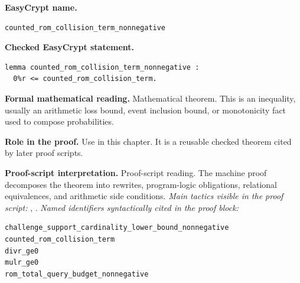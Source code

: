 \begin{formaltheorem}
\noindent\textbf{EasyCrypt name.}
\begin{lstlisting}[language=EasyCrypt,basicstyle=\ttfamily\scriptsize]
counted_rom_collision_term_nonnegative
\end{lstlisting}
\noindent\textbf{Checked EasyCrypt statement.}
\begin{lstlisting}[language=EasyCrypt,basicstyle=\ttfamily\scriptsize]
lemma counted_rom_collision_term_nonnegative :
  0%r <= counted_rom_collision_term.
\end{lstlisting}
\noindent\textbf{Formal mathematical reading.}
Mathematical theorem. This is an inequality, usually an arithmetic loss bound, event inclusion bound, or monotonicity fact used to compose probabilities.

\noindent\textbf{Role in the proof.}
Use in this chapter. It is a reusable checked theorem cited by later proof scripts.

\noindent\textbf{Proof-script interpretation.}
Proof-script reading. The machine proof decomposes the theorem into rewrites, program-logic obligations, relational equivalences, and arithmetic side conditions.
\emph{Main tactics visible in the proof script:} , .
\emph{Named identifiers syntactically cited in the proof block:}
\begin{lstlisting}[language=EasyCrypt,basicstyle=\ttfamily\scriptsize]
challenge_support_cardinality_lower_bound_nonnegative
counted_rom_collision_term
divr_ge0
mulr_ge0
rom_total_query_budget_nonnegative
\end{lstlisting}

\end{formaltheorem}

